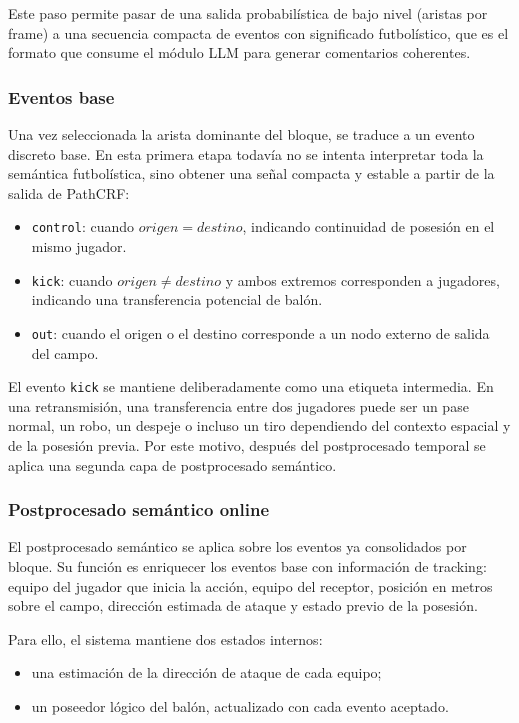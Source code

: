 Este paso permite pasar de una salida probabilística de bajo nivel (aristas por frame) a una secuencia compacta de eventos con significado futbolístico, que es el formato que consume el módulo LLM para generar comentarios coherentes.

\subsubsection{Eventos base}

Una vez seleccionada la arista dominante del bloque, se traduce a un evento discreto base. En esta primera etapa todavía no se intenta interpretar toda la semántica futbolística, sino obtener una señal compacta y estable a partir de la salida de PathCRF:

\begin{itemize}
    \item \texttt{control}: cuando \(origen = destino\), indicando continuidad de posesión en el mismo jugador.
    \item \texttt{kick}: cuando \(origen \neq destino\) y ambos extremos corresponden a jugadores, indicando una transferencia potencial de balón.
    \item \texttt{out}: cuando el origen o el destino corresponde a un nodo externo de salida del campo.
\end{itemize}

El evento \texttt{kick} se mantiene deliberadamente como una etiqueta intermedia. En una retransmisión, una transferencia entre dos jugadores puede ser un pase normal, un robo, un despeje o incluso un tiro dependiendo del contexto espacial y de la posesión previa. Por este motivo, después del postprocesado temporal se aplica una segunda capa de postprocesado semántico.

\subsubsection{Postprocesado semántico online}

El postprocesado semántico se aplica sobre los eventos ya consolidados por bloque. Su función es enriquecer los eventos base con información de tracking: equipo del jugador que inicia la acción, equipo del receptor, posición en metros sobre el campo, dirección estimada de ataque y estado previo de la posesión.

Para ello, el sistema mantiene dos estados internos:

\begin{itemize}
    \item una estimación de la dirección de ataque de cada equipo;
    \item un poseedor lógico del balón, actualizado con cada evento aceptado.
\end{itemize}

